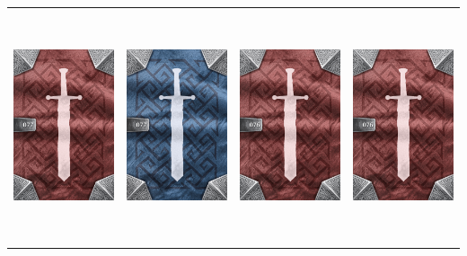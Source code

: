 \documentclass{minimal}
\begin{document}
{\begin{longtable}{llll}
\includegraphics[width=44mm,height=68mm]{./64-151/gh-077b-frigid-blade-back.png} &
\includegraphics[width=44mm,height=68mm]{./64-151/gh-077a-frigid-blade-back.png} &
\includegraphics[width=44mm,height=68mm]{./64-151/gh-076b-chain-hood-back.png} &
\includegraphics[width=44mm,height=68mm]{./64-151/gh-076b-chain-hood-back.png}\\ 

\end{longtable}}
\end{document}
